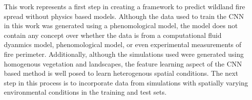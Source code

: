 \documentclass[twocolumn]{svjour3}          %
\begin{document}
This work represents a first step in creating a framework to predict
wildland fire spread without physics based models. Although the data
used to train the CNN in this work was generated using a phenomological
model, the model does not contain any concept over whether the data
is from a computational fluid dyanmics model, phenomological model, or
even experimental measurements of fire perimeter. Additionally, although
the simulations used were generated using homogenous vegetation and
landscapes, the feature learning aspect of the CNN based method is
well posed to learn heterogenous spatial conditions. The next step
in this process is to incorporate data from simulations with spatially
varying environmental conditions in the training and test sets.



%
%





%
%

\end{document}
